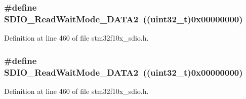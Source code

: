 \subsubsection[{\texorpdfstring{S\+D\+I\+O\+\_\+\+Read\+Wait\+Mode\+\_\+\+D\+A\+T\+A2}{SDIO_ReadWaitMode_DATA2}}]{\setlength{\rightskip}{0pt plus 5cm}\#define S\+D\+I\+O\+\_\+\+Read\+Wait\+Mode\+\_\+\+D\+A\+T\+A2~(({\bf uint32\+\_\+t})0x00000000)}\hypertarget{group___s_d_i_o___read___wait___mode_ga3d6952d82468b49dcc7abd5b9e02039f}{}\label{group___s_d_i_o___read___wait___mode_ga3d6952d82468b49dcc7abd5b9e02039f}


Definition at line 460 of file stm32f10x\+\_\+sdio.\+h.

\subsubsection[{\texorpdfstring{S\+D\+I\+O\+\_\+\+Read\+Wait\+Mode\+\_\+\+D\+A\+T\+A2}{SDIO_ReadWaitMode_DATA2}}]{\setlength{\rightskip}{0pt plus 5cm}\#define S\+D\+I\+O\+\_\+\+Read\+Wait\+Mode\+\_\+\+D\+A\+T\+A2~(({\bf uint32\+\_\+t})0x00000000)}\hypertarget{group___s_d_i_o___read___wait___mode_ga3d6952d82468b49dcc7abd5b9e02039f}{}\label{group___s_d_i_o___read___wait___mode_ga3d6952d82468b49dcc7abd5b9e02039f}


Definition at line 460 of file stm32f10x\+\_\+sdio.\+h.

